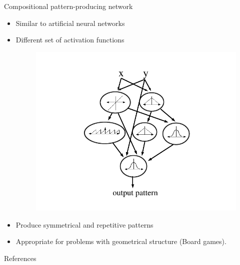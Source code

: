 \documentclass{beamer}
\begin{document}
\begin{frame}{Compositional pattern-producing network}
\begin{itemize}
\item Similar to artificial neural networks
\item Different set of activation functions
\begin{figure}
\begin{center}
\includegraphics[scale=0.25]{figures/cppnNetwork.png}
\end{center}
\end{figure}
\item Produce symmetrical and repetitive patterns
\item Appropriate for problems with geometrical structure (Board games).
\end{itemize}

\end{frame}

\begin{frame}{References}


\end{frame}
\end{document}
